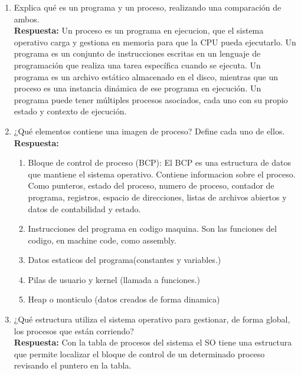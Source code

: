 \documentclass[a4paper,12pt]{article}
\begin{document}
\begin{enumerate}[label=\textbf{Pregunta \arabic*.}]
    \item Explica qué es un programa y un proceso, realizando una comparación de ambos. \\
    \textbf{Respuesta:} Un proceso es un programa en ejecucion, que el sistema operativo carga y gestiona en memoria para que la CPU pueda ejecutarlo. Un programa es un conjunto de instrucciones escritas en un lenguaje de programación que realiza una tarea específica cuando se ejecuta. Un programa es un archivo estático almacenado en el disco, mientras que un proceso es una instancia dinámica de ese programa en ejecución. Un programa puede tener múltiples procesos asociados, cada uno con su propio estado y contexto de ejecución.

    \item ¿Qué elementos contiene una imagen de proceso? Define cada uno de ellos. \\
    \textbf{Respuesta:} 
    \begin{enumerate}
        \item Bloque de control de proceso (BCP): El BCP es una estructura de datos que mantiene el sistema operativo. Contiene informacion sobre el proceso. Como punteros, estado del proceso, numero de proceso, contador de programa, registros, espacio de direcciones, listas de archivos abiertos y datos de contabilidad y estado.
        \item Instrucciones del programa en codigo maquina. Son las funciones del codigo, en machine code, como assembly.
        \item Datos estaticos del programa(constantes y variables.)
        \item Pilas de usuario y kernel (llamada a funciones.)
        \item Heap o monticulo (datos creados de forma dinamica)
    \end{enumerate}
    \newpage
    \item ¿Qué estructura utiliza el sistema operativo para gestionar, de forma global, los procesos que están corriendo? \\
    \textbf{Respuesta:} %
    Con la tabla de procesos del sistema el SO tiene una estructura que permite localizar el bloque de control de un determinado proceso revisando el puntero en la tabla.
    

\end{enumerate}
\end{document}
